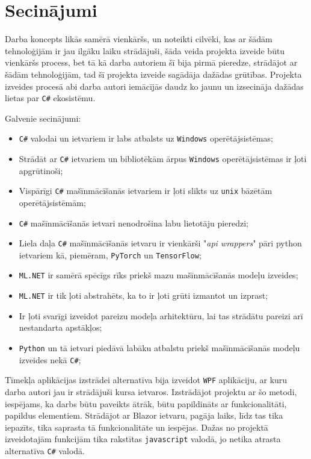 \section{Secinājumi}

    Darba koncepts likās samērā vienkāršs, un noteikti cilvēki, kas ar šādām tehnoloģijām ir jau
    ilgāku laiku strādājuši, šāda veida projekta izveide būtu vienkāršs process, bet tā kā darba autoriem
    šī bija pirmā pieredze, strādājot ar šādām tehnoloģijām, tad šī projekta izveide sagādāja dažādas
    grūtības. Projekta izveides procesā abi darba autori iemācījās daudz ko jaunu  un izsecināja
    dažādas lietas par \texttt{C\#} ekosistēmu.

    Galvenie secinājumi:
    \begin{itemize}
        \item \texttt{C\#} valodai un ietvariem ir labs atbalsts uz \texttt{Windows} operētājsistēmas;
        \item Strādāt ar \texttt{C\#} ietvariem un bibliotēkām ārpus \texttt{Windows} operētājsistēmas ir ļoti apgrūtinoši;
        \item Vispārīgi \texttt{C\#} mašīnmācīšanās ietvariem ir ļoti slikts uz \texttt{unix} bāzētām operētājsistēmām;
        \item \texttt{C\#} mašīnmācīšanās ietvari nenodrošina labu lietotāju pieredzi;
        \item Liela daļa \texttt{C\#} mašīnmācīšanās ietvaru ir vienkārši "\textit{api wrappers}" pāri python ietvariem kā, piemēram, \texttt{PyTorch} un \texttt{TensorFlow};
        \item \texttt{ML.NET} ir samērā spēcīgs rīks priekš mazu mašīnmācīšanās modeļu izveides;
        \item \texttt{ML.NET} ir tik ļoti abstrahēts, ka to ir ļoti grūti izmantot un izprast;
        \item Ir ļoti svarīgi izveidot pareizu modeļa arhitektūru, lai tas strādātu pareizi arī nestandarta apstākļos;
        \item \texttt{Python} un tā ietvari piedāvā labāku atbalstu priekš mašīnmācīšanās modeļu izveides nekā \texttt{C\#};
    \end{itemize}


    \par Tīmekļa aplikācijas izstrādei alternatīva bija izveidot \texttt{WPF} aplikāciju, ar kuru darba autori jau ir strādājuši kursa ietvaros. Izstrādājot projektu ar šo metodi, iespējams, ka darbs būtu paveikts ātrāk, būtu papildināts ar funkcionalitāti, papildus elementiem. Strādājot ar Blazor ietvaru, pagāja laiks, līdz tas tika iepazīts, tika saprasta tā funkcionalitāte un iespējas. Dažas no projektā izveidotajām funkcijām tika rakstītas \texttt{javascript} valodā, jo netika atrasta alternatīva \texttt{C\#} valodā.